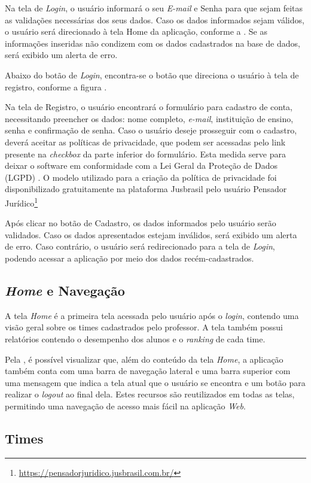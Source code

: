 Na tela de \textit{Login}, o usuário informará o seu \textit{E-mail} e Senha para que sejam feitas as validações necessárias dos seus dados. Caso os dados informados sejam válidos, o usuário será direcionado à tela Home da aplicação, conforme a . Se as informações inseridas não condizem com os dados cadastrados na base de dados, será exibido um alerta de erro. 

Abaixo do botão de \textit{Login}, encontra-se o botão que direciona o usuário à tela de registro, conforme a figura .


Na tela de Registro, o usuário encontrará o formulário para cadastro de conta, necessitando preencher os dados: nome completo, \textit{e-mail}, instituição de ensino, senha e confirmação de senha. Caso o usuário deseje prosseguir com o cadastro, deverá aceitar as políticas de privacidade, que podem ser acessadas pelo link presente na \textit{checkbox} da parte inferior do formulário. Esta medida serve para deixar o software em conformidade com a Lei Geral da Proteção de Dados (LGPD) \cite{lgpd}. O modelo utilizado para a criação da política de privacidade foi disponibilizado gratuitamente na plataforma Jusbrasil pelo usuário Pensador Jurídico\footnote{\url{https://pensadorjuridico.jusbrasil.com.br/}} \cite{politica-privacidade}

Após clicar no botão de Cadastro, os dados informados pelo usuário serão validados. Caso os dados apresentados estejam inválidos, será exibido um alerta de erro. Caso contrário, o usuário será redirecionado para a tela de \textit{Login}, podendo acessar a aplicação por meio dos dados recém-cadastrados.

\subsection{\textit{Home} e Navegação}

A tela \textit{Home} é a primeira tela acessada pelo usuário após o \textit{login}, contendo uma visão geral sobre os times cadastrados pelo professor. A tela também possui relatórios contendo o desempenho dos alunos e o \textit{ranking} de cada time.


Pela , é possível visualizar que, além do conteúdo da tela \textit{Home}, a aplicação também conta com uma barra de navegação lateral e uma barra superior com uma mensagem que indica a tela atual que o usuário se encontra e um botão para realizar o \textit{logout} ao final dela. Estes recursos são reutilizados em todas as telas, permitindo uma navegação de acesso mais fácil na aplicação \textit{Web}.

\subsection{Times}


